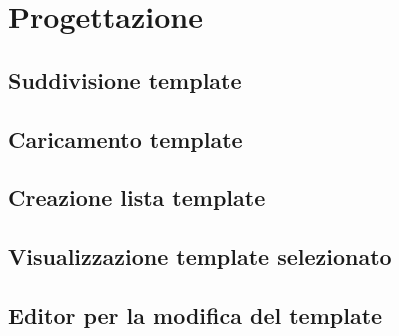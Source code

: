 
\chapter{Progettazione}
\label{cap:progettazione}
\section{Suddivisione template}
\section{Caricamento template}
\section{Creazione lista template}
\section{Visualizzazione template selezionato}
\section{Editor per la modifica del template}
